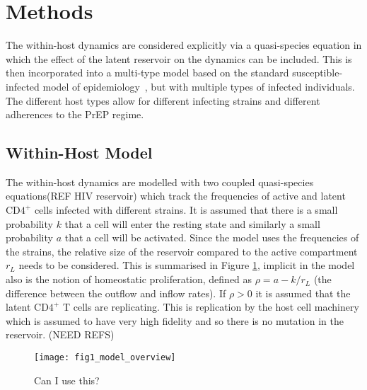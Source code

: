 \documentclass[DIV=15]{scrartcl}
\begin{document}
\fi

\section{Methods}
The within-host dynamics are considered explicitly via a   quasi-species equation in which the effect of the latent reservoir on the dynamics can be included.  This is then incorporated into a multi-type model based on the standard susceptible-infected  model of epidemiology~\cite{diekmann2013}, but with multiple types of infected individuals. The different host types allow for different infecting strains and different adherences to the PrEP regime.


\subsection{Within-Host Model}



The within-host dynamics are modelled with two coupled quasi-species equations(REF HIV reservoir) which  track the frequencies of active and latent CD$4^+$ cells infected with different strains. It is assumed that there is a small probability $k$ that  a cell will enter the resting state and similarly a small probability $a$  that a cell will  be activated. Since the model uses the frequencies of the strains, the relative size of the reservoir compared to the active compartment $r_L$ needs to be considered. This is summarised in Figure \ref{Within Host Diagram}, implicit in the model also is  the notion of homeostatic proliferation, defined as $\rho = a - k/r_L$ (the difference between the outflow and inflow rates). If $\rho>0$
 it is assumed that
the latent CD$4^+$ T cells  are replicating. This is replication by the host cell machinery which is assumed  to have very high fidelity and so there is no mutation in the reservoir. (NEED REFS)
\begin{figure}[h]
 \begin{center}
 \texttt{[image: fig1\_model\_overview]}
 \end{center}
 \caption{Can I use this?}
 \label{Within Host Diagram}
 \end{figure}
 
\end{document}
